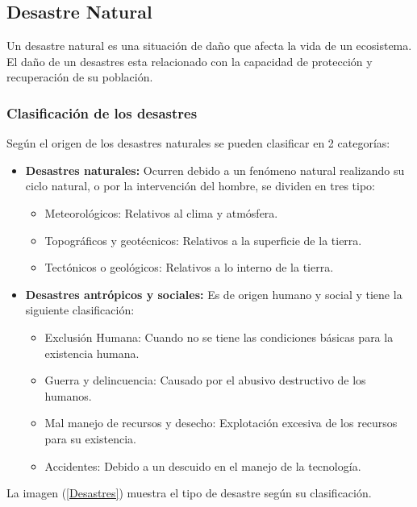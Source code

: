 \documentclass[11pt,openany]{book}
\begin{document}
	\subsection{Desastre Natural}

	Un desastre natural es una situación de daño que afecta la vida de un ecosistema\cite{vargas2002}. El daño de un desastres esta relacionado con la capacidad de protección y recuperación de su población.
	\subsubsection{Clasificación de los desastres}
	Según el origen de los desastres naturales se pueden clasificar en 2 categorías:
	\begin{itemize}
		\item \textbf{Desastres naturales: }Ocurren debido a un fenómeno natural realizando su ciclo natural, o por la intervención del hombre, se dividen en tres tipo:
		\begin{itemize}
			\item Meteorológicos: Relativos al clima y atmósfera.
			\item Topográficos y geotécnicos: Relativos a la superficie de la tierra.
			\item Tectónicos o geológicos: Relativos a lo interno de la tierra.
		\end{itemize}
		\item \textbf{Desastres antrópicos y sociales: }Es de origen humano y social y tiene la siguiente clasificación:
		\begin{itemize}
			\item Exclusión Humana: Cuando no se tiene las condiciones básicas para la existencia humana.
			\item Guerra y delincuencia: Causado por el abusivo destructivo de los humanos.
			\item Mal manejo de recursos y desecho: Explotación excesiva de los recursos para su existencia.
			\item Accidentes: Debido a un descuido en el manejo de la tecnología.
		\end{itemize}
	\end{itemize}

	La imagen (\ref{Desastres}) muestra el tipo de desastre según su clasificación.

	\newpage
\end{document}
